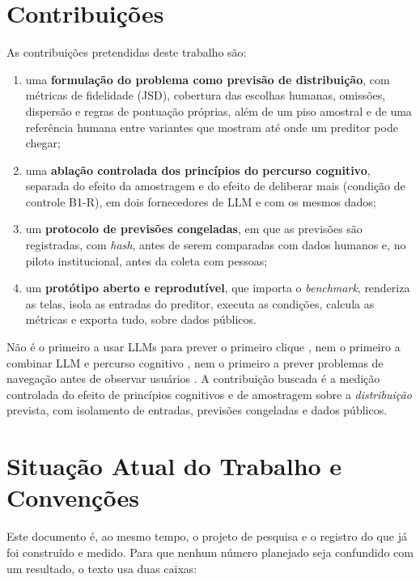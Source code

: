 \documentclass[12pt,oneside,a4paper,chapter=TITLE,english,brazil]{abntex2}
\begin{document}
\section{Contribuições}
\label{sec:contribuicoes}

As contribuições pretendidas deste trabalho são:

\begin{enumerate}
\item uma \textbf{formulação do problema como previsão de distribuição}, com métricas de fidelidade (JSD), cobertura das escolhas humanas, omissões, dispersão e regras de pontuação próprias, além de um piso amostral e de uma referência humana entre variantes que mostram até onde um preditor pode chegar;
\item uma \textbf{ablação controlada dos princípios do percurso cognitivo}, separada do efeito da amostragem e do efeito de deliberar mais (condição de controle B1-R), em dois fornecedores de LLM e com os mesmos dados;
\item um \textbf{protocolo de previsões congeladas}, em que as previsões são registradas, com \textit{hash}, antes de serem comparadas com dados humanos e, no piloto institucional, antes da coleta com pessoas;
\item um \textbf{protótipo aberto e reprodutível}, que importa o \textit{benchmark}, renderiza as telas, isola as entradas do preditor, executa as condições, calcula as métricas e exporta tudo, sobre dados públicos.
\end{enumerate}

\begin{destaque}
Não é o primeiro a usar LLMs para prever o primeiro clique \cite{kuric2026wwgc}, nem o primeiro a combinar LLM e percurso cognitivo \cite{bisante2024cwgpt,zhong2025syntheticcw}, nem o primeiro a prever problemas de navegação antes de observar usuários \cite{blackmon2002cww,blackmon2005autocww,teo2012cogtoolexplorer}. A contribuição buscada é a medição controlada do efeito de princípios cognitivos e de amostragem sobre a \emph{distribuição} prevista, com isolamento de entradas, previsões congeladas e dados públicos.
\end{destaque}

\section{Situação Atual do Trabalho e Convenções}
\label{sec:situacao}

Este documento é, ao mesmo tempo, o projeto de pesquisa e o registro do que já foi construído e medido. Para que nenhum número planejado seja confundido com um resultado, o texto usa duas caixas:
\end{document}
